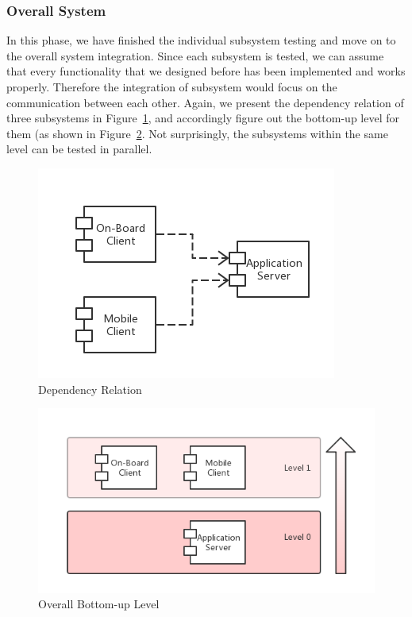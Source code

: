 \documentclass[a4paper,11pt]{article}
\begin{document}
	\subsubsection{Overall System}
	In this phase, we have finished the individual subsystem testing and move on to the overall system integration. Since each subsystem is tested, we can assume that every functionality that we designed before has been implemented and works properly. Therefore the integration of subsystem would focus on the communication between each other. Again, we present the dependency relation of three subsystems in Figure~\ref{fig-depa}, and accordingly figure out the bottom-up level for them (as shown in Figure~\ref{fig-overall}. Not surprisingly, the subsystems within the same level can be tested in parallel. 
		\begin{figure}[H]
   			\centering
  			\includegraphics[width=\textwidth]{images/depa}
  	    		\caption{Dependency Relation}\label{fig-depa}
		\end{figure}
		\begin{figure}[H]
   			\centering
  			\includegraphics[width=\textwidth]{images/overall}
  	    		\caption{Overall Bottom-up Level}\label{fig-overall}
		\end{figure}
\end{document}

